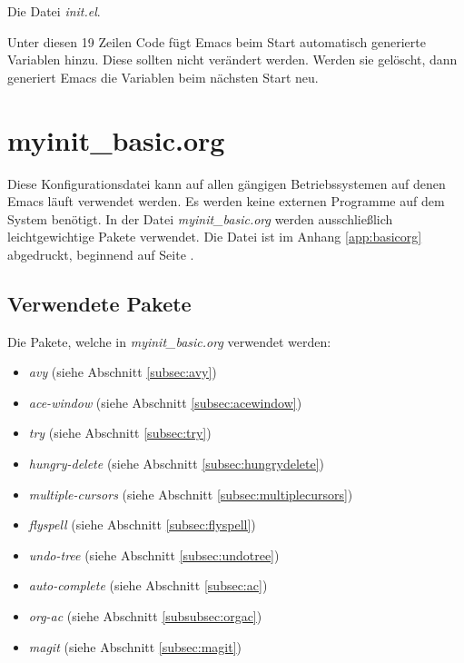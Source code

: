 \begin{program}[ht]

\caption{\label{code:initel} Die Datei \textit{init.el}.}
\end{program}

Unter diesen 19 Zeilen Code fügt Emacs beim Start automatisch
generierte Variablen hinzu. Diese sollten nicht verändert
werden. Werden sie gelöscht, dann generiert Emacs die Variablen beim
nächsten Start neu.\\

\section{myinit\_basic.org}
\label{sec:myinitbasic}
Diese Konfigurationsdatei kann auf allen gängigen Betriebssystemen auf
denen Emacs läuft verwendet werden. Es werden keine externen Programme
auf dem System benötigt. In der Datei \textit{myinit\_basic.org}
werden ausschließlich {\glqq}leichtgewichtige{\grqq} Pakete
verwendet. Die Datei ist im Anhang \ref{app:basicorg} abgedruckt,
beginnend auf Seite \pageref{app:basicorg}.\\

\subsection{Verwendete Pakete}
\label{subsec:basicverwpak}
Die Pakete, welche in \textit{myinit\_basic.org} verwendet werden:
\begin{itemize}
\item \textit{avy} (siehe Abschnitt \ref{subsec:avy})
\item \textit{ace-window} (siehe Abschnitt \ref{subsec:acewindow})
\item \textit{try} (siehe Abschnitt \ref{subsec:try})
\item \textit{hungry-delete} (siehe Abschnitt
  \ref{subsec:hungrydelete})
\item \textit{multiple-cursors} (siehe Abschnitt
  \ref{subsec:multiplecursors})
\item \textit{flyspell} (siehe Abschnitt \ref{subsec:flyspell})
\item \textit{undo-tree} (siehe Abschnitt \ref{subsec:undotree})
\item \textit{auto-complete} (siehe Abschnitt \ref{subsec:ac})
\item \textit{org-ac} (siehe Abschnitt \ref{subsubsec:orgac})
\item \textit{magit} (siehe Abschnitt \ref{subsec:magit})
\end{itemize}

